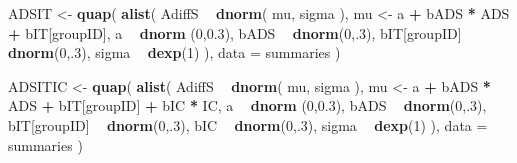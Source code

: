 \documentclass[10pt,dvipsnames,enabledeprecatedfontcommands]{scrartcl}
\newenvironment{Shaded}{\begin{snugshade}}{\end{snugshade}}
\newcommand{\DataTypeTok}[1]{\textcolor[rgb]{0.13,0.29,0.53}{#1}}
\newcommand{\DecValTok}[1]{\textcolor[rgb]{0.00,0.00,0.81}{#1}}
\newcommand{\FloatTok}[1]{\textcolor[rgb]{0.00,0.00,0.81}{#1}}
\newcommand{\KeywordTok}[1]{\textcolor[rgb]{0.13,0.29,0.53}{\textbf{#1}}}
\newcommand{\NormalTok}[1]{#1}
\newcommand{\OperatorTok}[1]{\textcolor[rgb]{0.81,0.36,0.00}{\textbf{#1}}}
\newcommand{\StringTok}[1]{\textcolor[rgb]{0.31,0.60,0.02}{#1}}
\begin{document}
\begin{Shaded}
\begin{Highlighting}[]
\NormalTok{ADSIT <-}\StringTok{ }\KeywordTok{quap}\NormalTok{(}
  \KeywordTok{alist}\NormalTok{(}
\NormalTok{    AdiffS }\OperatorTok{~}\StringTok{ }\KeywordTok{dnorm}\NormalTok{( mu, sigma ),}
\NormalTok{    mu <-}\StringTok{ }\NormalTok{a }\OperatorTok{+}\StringTok{ }\NormalTok{bADS }\OperatorTok{*}\StringTok{ }\NormalTok{ADS }\OperatorTok{+}\StringTok{  }\NormalTok{bIT[groupID],}
\NormalTok{    a }\OperatorTok{~}\StringTok{ }\KeywordTok{dnorm}\NormalTok{ (}\DecValTok{0}\NormalTok{,}\FloatTok{0.3}\NormalTok{),}
\NormalTok{    bADS }\OperatorTok{~}\StringTok{ }\KeywordTok{dnorm}\NormalTok{(}\DecValTok{0}\NormalTok{,.}\DecValTok{3}\NormalTok{),}
\NormalTok{    bIT[groupID] }\OperatorTok{~}\StringTok{ }\KeywordTok{dnorm}\NormalTok{(}\DecValTok{0}\NormalTok{,.}\DecValTok{3}\NormalTok{),}
\NormalTok{    sigma  }\OperatorTok{~}\StringTok{ }\KeywordTok{dexp}\NormalTok{(}\DecValTok{1}\NormalTok{)}
\NormalTok{  ), }
  \DataTypeTok{data =}\NormalTok{ summaries}
\NormalTok{)}


\NormalTok{ADSITIC <-}\StringTok{ }\KeywordTok{quap}\NormalTok{(}
  \KeywordTok{alist}\NormalTok{(}
\NormalTok{    AdiffS }\OperatorTok{~}\StringTok{ }\KeywordTok{dnorm}\NormalTok{( mu, sigma ),}
\NormalTok{    mu <-}\StringTok{ }\NormalTok{a }\OperatorTok{+}\StringTok{ }\NormalTok{bADS }\OperatorTok{*}\StringTok{ }\NormalTok{ADS }\OperatorTok{+}\StringTok{  }\NormalTok{bIT[groupID] }\OperatorTok{+}\StringTok{ }\NormalTok{bIC }\OperatorTok{*}\StringTok{ }\NormalTok{IC,}
\NormalTok{    a }\OperatorTok{~}\StringTok{ }\KeywordTok{dnorm}\NormalTok{ (}\DecValTok{0}\NormalTok{,}\FloatTok{0.3}\NormalTok{),}
\NormalTok{    bADS }\OperatorTok{~}\StringTok{ }\KeywordTok{dnorm}\NormalTok{(}\DecValTok{0}\NormalTok{,.}\DecValTok{3}\NormalTok{),}
\NormalTok{    bIT[groupID] }\OperatorTok{~}\StringTok{ }\KeywordTok{dnorm}\NormalTok{(}\DecValTok{0}\NormalTok{,.}\DecValTok{3}\NormalTok{),}
\NormalTok{    bIC }\OperatorTok{~}\StringTok{ }\KeywordTok{dnorm}\NormalTok{(}\DecValTok{0}\NormalTok{,.}\DecValTok{3}\NormalTok{),}
\NormalTok{    sigma  }\OperatorTok{~}\StringTok{ }\KeywordTok{dexp}\NormalTok{(}\DecValTok{1}\NormalTok{)}
\NormalTok{  ), }
  \DataTypeTok{data =}\NormalTok{ summaries}
\NormalTok{)}



\end{Highlighting}
\end{Shaded}
\end{document}
